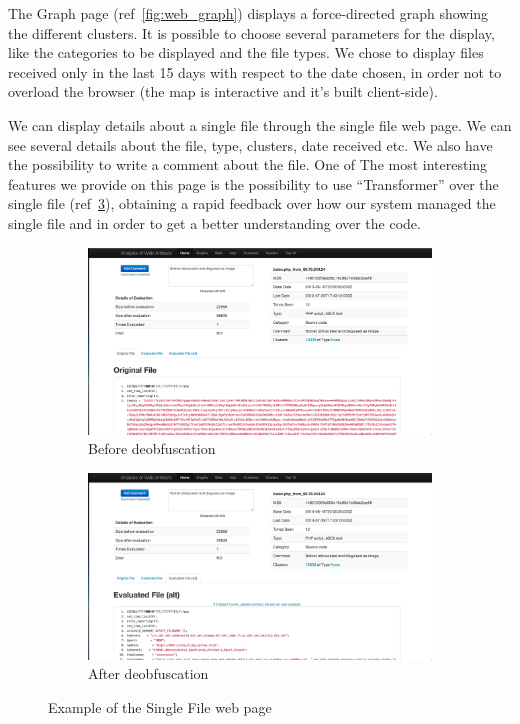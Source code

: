 The Graph page (ref~\ref{fig:web_graph}) displays a force-directed graph showing the different clusters. It is possible to choose several parameters for the display, like the categories to be displayed and the file types. We chose to display files received only in the last 15 days with respect to the date chosen, in order not to overload the browser (the map is interactive and it's built client-side).

We can display details about a single file through the single file web page. We can see several details about the file, type, clusters, date received etc. We also have the possibility to write a comment about the file.
One of The most interesting features we provide on this page is the possibility to use ``Transformer'' over the single file (ref~\ref{fig:deobfDouble}), obtaining a rapid feedback over how our system managed the single file and in order to get a better understanding over the code.

\begin{figure}
\centering
\begin{subfigure}{.5\textwidth}
  \centering
  \includegraphics[width=1.0\linewidth]{Images/obf_file.jpg}
  \caption{Before deobfuscation}
  \label{fig:sub1}
\end{subfigure}%
\begin{subfigure}{.5\textwidth}
  \centering
  \includegraphics[width=1.0\linewidth]{Images/deobf_file.jpg}
  \caption{After deobfuscation}
  \label{fig:sub2}
\end{subfigure}
\caption{Example of the Single File web page}
\label{fig:deobfDouble}
\end{figure}
